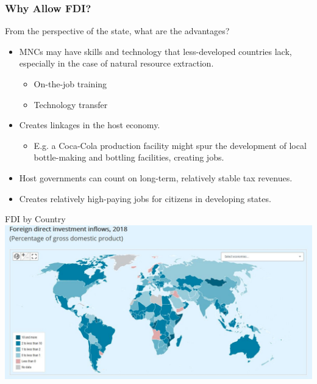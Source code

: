 \documentclass[handout]{beamer}
\begin{document}
\begin{frame} 
	\frametitle{\LARGE{Why Allow FDI?}}
	From the perspective of the state, what are the advantages?
	\begin{itemize}
		
		\item MNCs may have skills and technology that less-developed countries lack, especially in the case of natural resource extraction.  \pause 
		\begin{itemize}
			\item On-the-job training  \pause
			\item Technology transfer \pause 
		\end{itemize}
		\item Creates linkages in the host economy. \pause 
		\begin{itemize}
			\item E.g. a Coca-Cola production facility might spur the development of local bottle-making and bottling facilities, creating jobs. \pause 
		\end{itemize}
		\item Host governments can count on long-term, relatively stable tax revenues. \pause
		\item Creates relatively high-paying jobs for citizens in developing states.
		
	\end{itemize}
\end{frame}


\begin{frame}{\LARGE FDI by Country}
	\centering
	\includegraphics[width=\textwidth,height=0.8\textheight,keepaspectratio]{FDI by country.JPG}
\end{frame}
\end{document}
